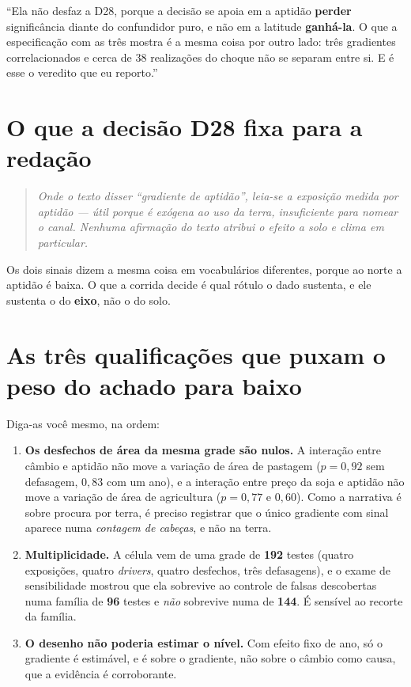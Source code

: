 \begin{nabanca}
``Ela não desfaz a D28, porque a decisão se apoia em a aptidão \textbf{perder}
significância diante do confundidor puro, e não em a latitude \textbf{ganhá-la}.
O que a especificação com as três mostra é a mesma coisa por outro lado: três
gradientes correlacionados e cerca de 38 realizações do choque não se separam
entre si. E é esse o veredito que eu reporto.''
\end{nabanca}

\section{O que a decisão D28 fixa para a redação}

\begin{quote}\itshape\color{cortinta}
Onde o texto disser ``gradiente de aptidão'', leia-se a exposição
\emph{medida} por aptidão --- útil porque é exógena ao uso da terra,
insuficiente para nomear o canal. Nenhuma afirmação do texto atribui o efeito a
solo e clima em particular.
\end{quote}

Os dois sinais dizem a mesma coisa em vocabulários diferentes, porque ao norte
a aptidão é baixa. O que a corrida decide é qual rótulo o dado sustenta, e ele
sustenta o do \textbf{eixo}, não o do solo.

\section{As três qualificações que puxam o peso do achado para baixo}

Diga-as você mesmo, na ordem:

\begin{enumerate}
\item \textbf{Os desfechos de área da mesma grade são nulos.} A interação entre
câmbio e aptidão não move a variação de área de pastagem ($p = 0{,}92$ sem
defasagem, $0{,}83$ com um ano), e a interação entre preço da soja e aptidão não
move a variação de área de agricultura ($p = 0{,}77$ e $0{,}60$). Como a
narrativa é sobre procura por terra, é preciso registrar que o único gradiente
com sinal aparece numa \emph{contagem de cabeças}, e não na terra.
\item \textbf{Multiplicidade.} A célula vem de uma grade de \textbf{192} testes
(quatro exposições, quatro \emph{drivers}, quatro desfechos, três defasagens), e
o exame de sensibilidade mostrou que ela sobrevive ao controle de falsas
descobertas numa família de \textbf{96} testes e \emph{não} sobrevive numa de
\textbf{144}. É sensível ao recorte da família.
\item \textbf{O desenho não poderia estimar o nível.} Com efeito fixo de ano, só
o gradiente é estimável, e é sobre o gradiente, não sobre o câmbio como
causa, que a evidência é corroborante.
\end{enumerate}

